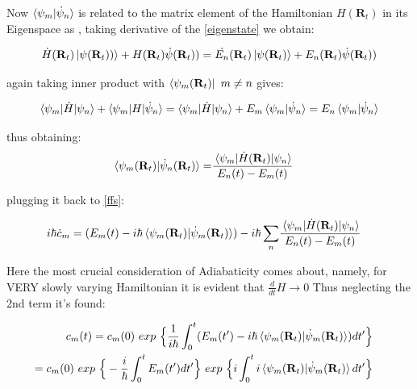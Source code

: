 \documentclass[8pt, twocoloumn]{article}
\begin{document}
Now $\braket{\psi_m|\dot{\psi}_n}$ is related to the matrix element of the Hamiltonian $H(\textbf{R}_t)$ in its Eigenspace as \cite{berrypaper}, taking derivative of the \ref{eigenstate} we obtain:

\begin{align}
\dot{H}(\textbf{R}_t)\ket{\psi(\textbf{R}_t))}+H(\textbf{R}_t)\dot{\psi}(\textbf{R}_t))=\dot{E_n}(\textbf{R}_t)\ket{\psi(\textbf{R}_t)}+E_n(\textbf{R}_t)\dot{\psi}(\textbf{R}_t))
\end{align}

again taking inner product with $\bra{\psi_m(\textbf{R}_t)} \ m\neq n$ gives:

\begin{align}
\braket{\psi_m|\dot{H}|\psi_n}+\braket{\psi_m|H|\dot{\psi}_n}= \braket{\psi_m|\dot{H}|\psi_n}+E_m\braket{\psi_m|\dot{\psi}_n}=E_n\braket{\psi_m|\dot{\psi}_n}
\end{align}

thus obtaining:
\begin{align}
\braket{\psi_m(\textbf{R}_t)|\dot{\psi}_n(\textbf{R}_t)}= & \braket{\psi_m|\dot{H}(\textbf{R}_t)|\psi_n} \over E_n(t) - E_m(t)
\end{align}

plugging it back to \ref{ffs}:

\begin{align}
i\hbar \dot{c}_m=(E_m(t)-i\hbar \braket{\psi_m(\textbf{R}_t)|\dot{\psi}_m(\textbf{R}_t)})-i\hbar\sum_{n} & \braket{\psi_m|\dot{H}(\textbf{R}_t)|\psi_n} \over E_n(t) - E_m(t)
\end{align}

Here the most crucial consideration of Adiabaticity comes about, namely, for VERY slowly varying Hamiltonian it is evident that $\frac{d}{dt}H \to 0$
Thus neglecting the 2nd term it's found:

\begin{align}
\begin{split}
c_m(t)={}& c_m(0) \ exp \ \Big\{ \frac{1}{i\hbar} \int^{t}_{0}(E_m(t')-i\hbar \braket{\psi_m(\textbf{R}_t)|\dot{\psi}_m(\textbf{R}_t)})dt' \Big\} \notag 
\end{split} \\
\begin{split}
={}& c_m(0) \ exp \ \Big\{ -\frac{i}{\hbar} \int^{t}_{0}E_m(t')dt' \Big\} \ exp \ \Big\{i\int^{t}_{0}i\braket{\psi_m(\textbf{R}_t)|\dot{\psi}_m(\textbf{R}_t)}dt' \Big\}
\end{split}
\end{align}
\end{document}
